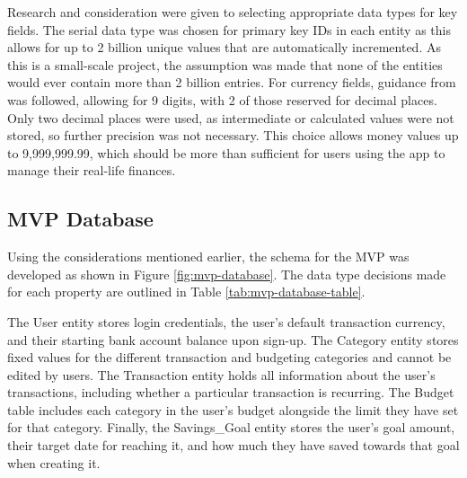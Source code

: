 \documentclass{l4proj}
\begin{document}
Research and consideration were given to selecting appropriate data types for key fields. The serial data type was chosen for primary key IDs in each entity as this allows for up to 2 billion unique values that are automatically incremented. As this is a small-scale project, the assumption was made that none of the entities would ever contain more than 2 billion entries. For currency fields, guidance from \citet{crunchydata_working_postgres} was followed, allowing for 9 digits, with 2 of those reserved for decimal places. Only two decimal places were used, as intermediate or calculated values were not stored, so further precision was not necessary. This choice allows money values up to 9,999,999.99, which should be more than sufficient for users using the app to manage their real-life finances.


\subsection{MVP Database}
Using the considerations mentioned earlier, the schema for the MVP was developed as shown in Figure \ref{fig:mvp-database}. The data type decisions made for each property are outlined in Table \ref{tab:mvp-database-table}.

The User entity stores login credentials, the user's default transaction currency, and their starting bank account balance upon sign-up. The Category entity stores fixed values for the different transaction and budgeting categories and cannot be edited by users. The Transaction entity holds all information about the user’s transactions, including whether a particular transaction is recurring. The Budget table includes each category in the user's budget alongside the limit they have set for that category. Finally, the Savings\_Goal entity stores the user’s goal amount, their target date for reaching it, and how much they have saved towards that goal when creating it.
\end{document}
